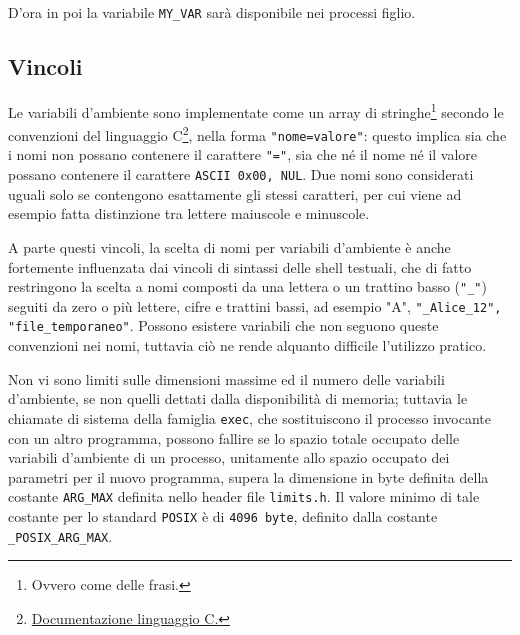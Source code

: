 \documentclass[11pt]{book}
\begin{document}
D'ora in poi la variabile \verb*|MY_VAR| sarà disponibile nei processi figlio. 
\subsection{Vincoli}
Le variabili d'ambiente sono implementate come un array di stringhe\footnote{Ovvero come delle frasi.} secondo le convenzioni del linguaggio C\footnote{\hyperref{https://en.cppreference.com/w/c/language}{docu}{C}{Documentazione linguaggio C.}}, nella forma \verb*|"nome=valore"|: questo implica sia che i nomi non possano contenere il carattere \verb*|"="|, sia che né il nome né il valore possano contenere il carattere \verb*|ASCII 0x00, NUL|. Due nomi sono considerati uguali solo se contengono esattamente gli stessi caratteri, per cui viene ad esempio fatta distinzione tra lettere maiuscole e minuscole.

A parte questi vincoli, la scelta di nomi per variabili d'ambiente è anche fortemente influenzata dai vincoli di sintassi delle shell testuali, che di fatto restringono la scelta a nomi composti da una lettera o un trattino basso (\verb*|"_"|) seguiti da zero o più lettere, cifre e trattini bassi, ad esempio "A", \verb*|"_Alice_12", "file_temporaneo"|. Possono esistere variabili che non seguono queste convenzioni nei nomi, tuttavia ciò ne rende alquanto difficile l'utilizzo pratico.

Non vi sono limiti sulle dimensioni massime ed il numero delle variabili d'ambiente, se non quelli dettati dalla disponibilità di memoria; tuttavia le chiamate di sistema della famiglia \verb*|exec|, che sostituiscono il processo invocante con un altro programma, possono fallire se lo spazio totale occupato delle variabili d'ambiente di un processo, unitamente allo spazio occupato dei parametri per il nuovo programma, supera la dimensione in byte definita della costante \verb*|ARG_MAX| definita nello header file \verb*|limits.h|. Il valore minimo di tale costante per lo standard \verb*|POSIX| è di \verb*|4096 byte|, definito dalla costante \verb*|_POSIX_ARG_MAX|.
\end{document}
